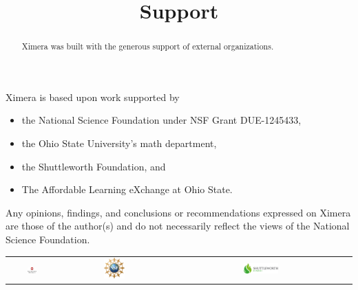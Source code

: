 \documentclass{ximera}
\title{Support}
\begin{document}
\begin{abstract}
  Ximera was built with the generous support of external organizations.
\end{abstract}
\maketitle

Ximera is based upon work supported by
\begin{itemize}
\item %
the National Science Foundation under NSF Grant DUE-1245433,
\item %
the Ohio State University's math department,
\item %
the Shuttleworth Foundation, and
\item The Affordable Learning eXchange at Ohio State.
\end{itemize}

Any opinions, findings, and conclusions or recommendations expressed on Ximera are those of the author(s) and do not necessarily reflect the views of the National Science Foundation.

\begin{center}
\begin{tabular}{ccc}
\includegraphics[align=c,width=0.2\textwidth]{sponsors/osu.png} &
\includegraphics[align=c,width=0.2\textwidth]{sponsors/nsf.png} &
\includegraphics[align=c,width=0.2\textwidth]{sponsors/shuttleworth.png}
\end{tabular}
\end{center}
\end{document}
